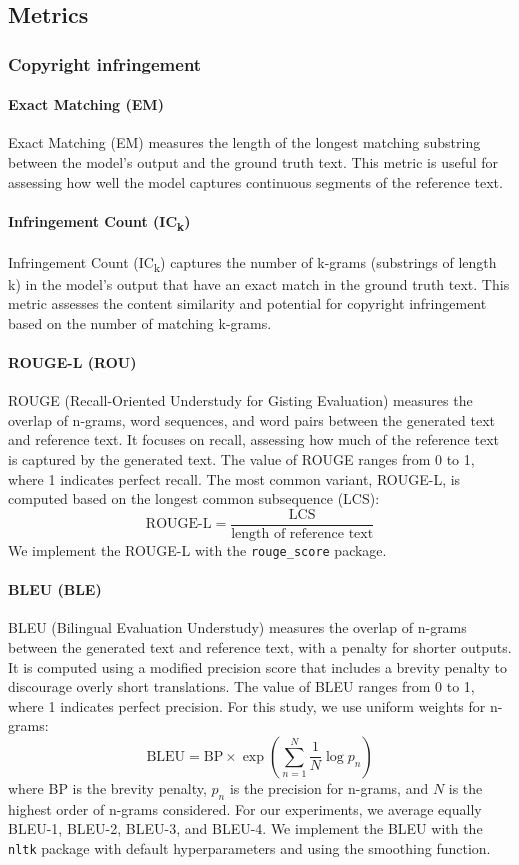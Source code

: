 \subsection{Metrics}
\label{app:metrics}

\subsubsection{Copyright infringement}
\label{app:metrics_copy}

\paragraph{Exact Matching (EM)}
Exact Matching (EM) measures the length of the longest matching substring between the model's output and the ground truth text. This metric is useful for assessing how well the model captures continuous segments of the reference text. 

\paragraph{Infringement Count (IC\textsubscript{k})}
Infringement Count (IC\textsubscript{k}) captures the number of k-grams (substrings of length k) in the model's output that have an exact match in the ground truth text. This metric assesses the content similarity and potential for copyright infringement based on the number of matching k-grams. 

\paragraph{ROUGE-L (ROU)} ROUGE (Recall-Oriented Understudy for Gisting Evaluation) measures the overlap of n-grams, word sequences, and word pairs between the generated text and reference text. It focuses on recall, assessing how much of the reference text is captured by the generated text. The value of ROUGE ranges from 0 to 1, where 1 indicates perfect recall. The most common variant, ROUGE-L, is computed based on the longest common subsequence (LCS):
\[
\text{ROUGE-L} = \frac{\text{LCS}}{\text{length of reference text}}
\]
We implement the ROUGE-L with the \texttt{rouge\_score} package. 

\paragraph{BLEU (BLE)}
BLEU (Bilingual Evaluation Understudy) measures the overlap of n-grams between the generated text and reference text, with a penalty for shorter outputs. It is computed using a modified precision score that includes a brevity penalty to discourage overly short translations. The value of BLEU ranges from 0 to 1, where 1 indicates perfect precision. For this study, we use uniform weights for n-grams:
\[
\text{BLEU} = \text{BP} \times \exp\left( \sum_{n=1}^{N} \frac{1}{N} \log p_n \right)
\]
where BP is the brevity penalty, \(p_n\) is the precision for n-grams, and \(N\) is the highest order of n-grams considered. For our experiments, we average equally BLEU-1, BLEU-2, BLEU-3, and BLEU-4. We implement the BLEU with the \texttt{nltk} package with default hyperparameters and using the smoothing function. 



